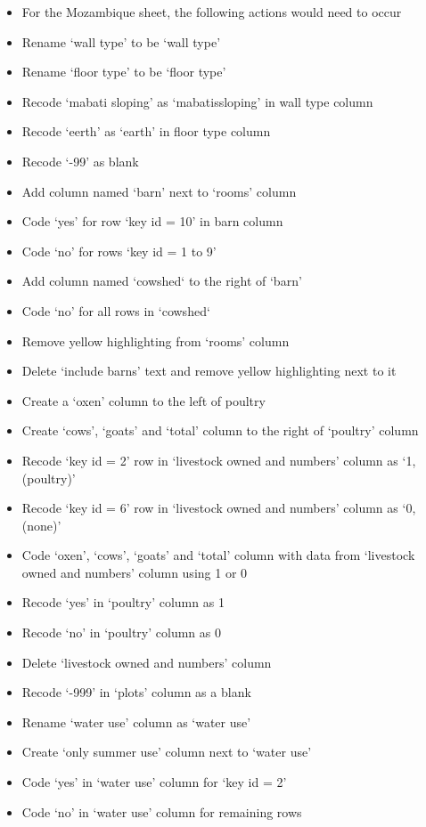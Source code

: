 \documentclass{article}
\begin{document}
\begin{itemize}
\item For the Mozambique sheet, the following actions would need to occur
\item Rename ‘wall type’ to be ‘wall type’
\item Rename ‘floor type’ to be ‘floor type’
\item Recode ‘mabati sloping’ as ‘mabatissloping’ in wall type column
\item Recode ‘eerth’ as ‘earth’ in floor type column
\item Recode ‘-99’ as blank
\item Add column named ‘barn’ next to ‘rooms’ column
\item Code ‘yes’ for row ‘key id = 10’ in barn column
\item Code ‘no’ for rows ‘key id = 1 to 9’
\item Add column named ‘cowshed‘ to the right of ‘barn’
\item Code ‘no’ for all rows in ‘cowshed‘
\item Remove yellow highlighting from ‘rooms’ column
\item Delete ‘include barns’ text and remove yellow highlighting next to it
\item Create a ‘oxen’ column to the left of poultry
\item Create ‘cows’, ‘goats’ and ‘total’ column to the right of ‘poultry’ column
\item Recode ‘key id = 2’ row in ‘livestock owned and numbers’ column as ‘1, (poultry)’
\item Recode ‘key id = 6’ row in ‘livestock owned and numbers’ column as ‘0, (none)’
\item Code ‘oxen’, ‘cows’, ‘goats’ and ‘total’ column with data from ‘livestock owned and numbers’ column using 1 or 0
\item Recode ‘yes’ in ‘poultry’ column as 1
\item Recode ‘no’ in ‘poultry’ column as 0
\item Delete ‘livestock owned and numbers’ column
\item Recode ‘-999’ in ‘plots’ column as a blank
\item Rename ‘water use’ column as ‘water use’
\item Create ‘only summer use’ column next to ‘water use’
\item Code ‘yes’ in ‘water use’ column for ‘key id = 2’
\item Code ‘no’ in ‘water use’ column for remaining rows

\end{itemize}
\end{document}
